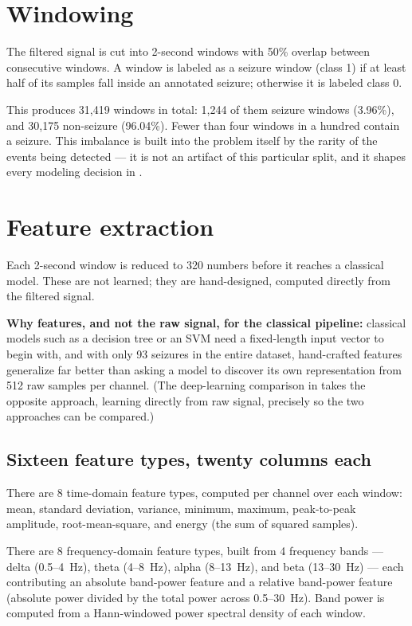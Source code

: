 \section{Windowing}

The filtered signal is cut into 2-second windows with 50\% overlap between consecutive windows.
A window is labeled as a seizure window (class 1) if at least half of its samples fall inside an
annotated seizure; otherwise it is labeled class 0.

This produces 31{,}419 windows in total: 1{,}244 of them seizure windows (3.96\%), and
30{,}175 non-seizure (96.04\%). Fewer than four windows in a hundred contain a seizure. This
imbalance is built into the problem itself by the rarity of the events being detected --- it is
not an artifact of this particular split, and it shapes every modeling decision in
.

\section{Feature extraction}

Each 2-second window is reduced to 320 numbers before it reaches a classical model. These are
not learned; they are hand-designed, computed directly from the filtered signal.

\textbf{Why features, and not the raw signal, for the classical pipeline:} classical models such
as a decision tree or an SVM need a fixed-length input vector to begin with, and with only 93
seizures in the entire dataset, hand-crafted features generalize far better than asking a model
to discover its own representation from 512 raw samples per channel. (The deep-learning
comparison in  takes the opposite approach, learning directly from raw
signal, precisely so the two approaches can be compared.)

\subsection{Sixteen feature types, twenty columns each}

There are 8 time-domain feature types, computed per channel over each window: mean, standard
deviation, variance, minimum, maximum, peak-to-peak amplitude, root-mean-square, and energy
(the sum of squared samples).

There are 8 frequency-domain feature types, built from 4 frequency bands --- delta
(0.5--4~Hz), theta (4--8~Hz), alpha (8--13~Hz), and beta (13--30~Hz) --- each contributing an
absolute band-power feature and a relative band-power feature (absolute power divided by the
total power across 0.5--30~Hz). Band power is computed from a Hann-windowed power spectral
density of each window.

